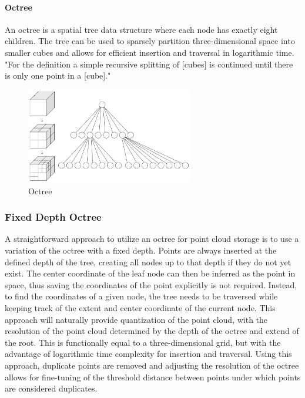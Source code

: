 \paragraph{Octree}
An octree is a spatial tree data structure where each node has exactly eight children.
The tree can be used to sparsely partition three-dimensional space into smaller cubes and allows for efficient
insertion and traversal in logarithmic time.
"For the definition a simple recursive splitting of [cubes] is continued until there is only one point in a [cube]."
\parencite{gabriel_zachmann_geometric_2002}

\begin{figure}[h]
    \centering
    \includegraphics[width=0.65\textwidth]{images/octree}
    \caption{Octree}
    \label{fig:octrree}
\end{figure}

\subsubsection{Fixed Depth Octree}
A straightforward approach to utilize an octree for point cloud storage is to use a variation of the octree with a fixed depth.
Points are always inserted at the defined depth of the tree, creating all nodes up to that depth if they do not yet exist.
The center coordinate of the leaf node can then be inferred as the point in space,
thus saving the coordinates of the point explicitly is not required.
Instead, to find the coordinates of a given node, the tree needs to be traversed while keeping track of
the extent and center coordinate of the current node.
This approach will naturally provide quantization of the point cloud, with the resolution of the point cloud
determined by the depth of the octree and extend of the root.
This is functionally equal to a three-dimensional grid,
but with the advantage of logarithmic time complexity for insertion and traversal.
Using this approach, duplicate points are removed and adjusting the resolution of the octree
allows for fine-tuning of the threshold distance between points under which points are considered duplicates.

